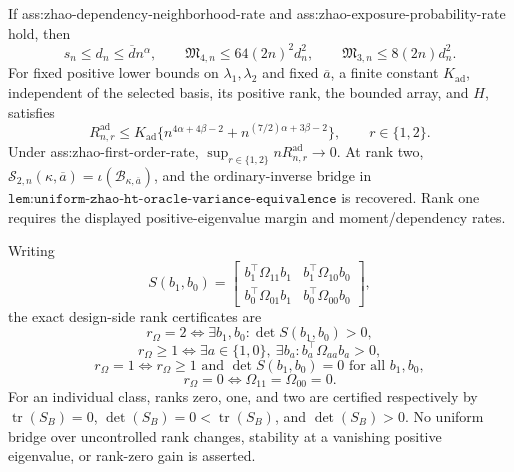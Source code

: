 If ass:zhao-dependency-neighborhood-rate and ass:zhao-exposure-probability-rate hold, then
\[
s_n\le d_n\le\overline d n^\alpha,
\qquad
\mathfrak M_{4,n}\le64(2n)^2d_n^2,
\qquad
\mathfrak M_{3,n}\le8(2n)d_n^2.
\]
For fixed positive lower bounds on \(\lambda_1,\lambda_2\) and fixed \(\overline a\), a finite constant \(K_{\mathrm{ad}}\), independent of the selected basis, its positive rank, the bounded array, and \(H\), satisfies
\[
R_{n,r}^{\mathrm{ad}}
\le K_{\mathrm{ad}}
\{n^{4\alpha+4\beta-2}
+n^{(7/2)\alpha+3\beta-2}\},
\qquad r\in\{1,2\}.
\]
Under ass:zhao-first-order-rate, \(\sup_{r\in\{1,2\}}nR_{n,r}^{\mathrm{ad}}\to0\).  At rank two, \(\mathcal S_{2,n}(\kappa,\overline a)=\iota(\mathcal B_{\kappa,\overline a})\), and the ordinary-inverse bridge in \(\texttt{lem:uniform-zhao-ht-oracle-variance-equivalence}\) is recovered.  Rank one requires the displayed positive-eigenvalue margin and moment/dependency rates.

Writing
\[
S(b_1,b_0)=
\begin{bmatrix}
b_1^{\top}\Omega_{11}b_1&b_1^{\top}\Omega_{10}b_0\\
b_0^{\top}\Omega_{01}b_1&b_0^{\top}\Omega_{00}b_0
\end{bmatrix},
\]
the exact design-side rank certificates are
\[
r_\Omega=2\Longleftrightarrow
\exists b_1,b_0:\det S(b_1,b_0)>0,
\]
\[
r_\Omega\ge1\Longleftrightarrow
\exists a\in\{1,0\},\ \exists b_a:
b_a^{\top}\Omega_{aa}b_a>0,
\]
\[
r_\Omega=1\Longleftrightarrow r_\Omega\ge1
\text{ and }\det S(b_1,b_0)=0\text{ for all }b_1,b_0,
\]
\[
r_\Omega=0\Longleftrightarrow\Omega_{11}=\Omega_{00}=0.
\]
For an individual class, ranks zero, one, and two are certified respectively by \(\operatorname{tr}(S_B)=0\), \(\det(S_B)=0<\operatorname{tr}(S_B)\), and \(\det(S_B)>0\).  No uniform bridge over uncontrolled rank changes, stability at a vanishing positive eigenvalue, or rank-zero gain is asserted.